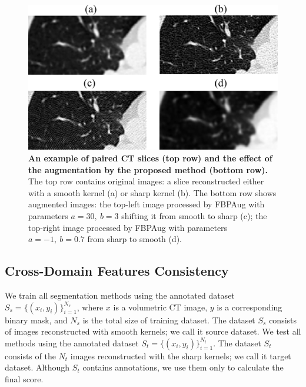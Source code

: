 

\begin{figure}[h]
	\centering
	\includegraphics[width=\linewidth]{Dissertation/Figures/3_ct/4crops.png}%
	\caption{\textbf{An example of paired CT slices (top row) and the effect of the augmentation by the proposed method (bottom row).} The top row contains original images: a slice reconstructed either with a smooth kernel (a) or sharp kernel (b). The bottom row shows augmented images: the top-left image processed by FBPAug with parameters $a=30,~b=3$ shifting it from smooth to sharp (c); the top-right image processed by FBPAug with parameters $a=-1,~b=0.7$ from sharp to smooth (d).}
	\label{fig:crops}
	\vspace{2\baselineskip}
\end{figure}



\subsection{Cross-Domain Features Consistency}

We train all segmentation methods using the annotated dataset $S_s = \{ ( x_i, y_i ) \}_{i=1}^{N_s}$, where $x$ is a volumetric CT image, $y$ is a corresponding binary mask, and $N_s$ is the total size of training dataset. The dataset $S_s$ consists of images reconstructed with smooth kernels; we call it source dataset. We test all methods using the annotated dataset $S_t = \{ ( x_i, y_i ) \}_{i=1}^{N_t}$. The dataset $S_t$ consists of the $N_t$ images reconstructed with the sharp kernels; we call it target dataset. Although $S_t$ contains annotations, we use them only to calculate the final score.


